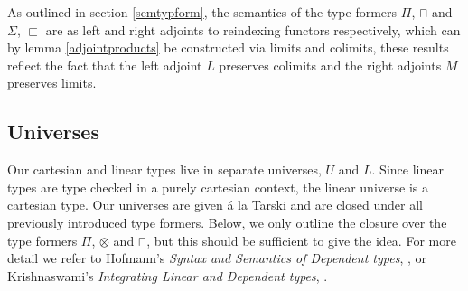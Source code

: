 As outlined in section \ref{semtypform}, the semantics of the type formers $\Pi$, $\sqcap$ and $\Sigma$, $\sqsubset$ are as left and right adjoints to reindexing functors respectively, which can by lemma \ref{adjointproducts} be constructed via limits and colimits, these results reflect the fact that the left adjoint $L$ preserves colimits and the right adjoints $M$ preserves limits.
\subsection{Universes}
Our cartesian and linear types live in separate universes, $U$ and $L$. Since linear types are type checked in a purely cartesian context, the linear universe is a cartesian type. Our universes are given á la Tarski and are closed under all previously introduced type formers. Below, we only outline the closure over the type formers $\Pi$, $\otimes$ and $\sqcap$, but this should be sufficient to give the idea. For more detail we refer to Hofmann's \textit{Syntax and Semantics of Dependent types}, \cite{hofmann1997syntax}, or Krishnaswami's \textit{Integrating Linear and Dependent types}, \cite{krishnaswami}.\\
